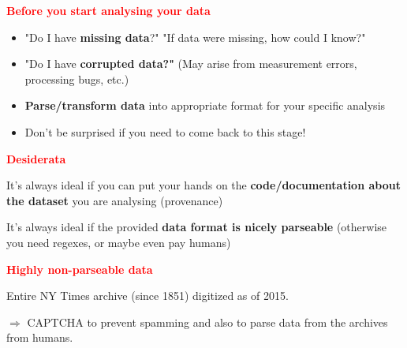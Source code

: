 \documentclass[11pt]{article}
\begin{document}
\vspace{0.5cm}

\textbf{\textcolor{red}{Before you start analysing your data}}

\begin{itemize}
	\item "Do I have \textbf{missing data}?" "If data were missing, how could I know?"
	\item "Do I have \textbf{corrupted data?"} (May arise from measurement errors, processing bugs, etc.) 
	\item \textbf{Parse/transform data} into appropriate format for your specific analysis 
	\item Don't be surprised if you need to come back to this stage!
\end{itemize}

\vspace{0.5cm}

\textbf{\textcolor{red}{Desiderata}}

It's always ideal if you can put your hands on the \textbf{code/documentation about the dataset} you are analysing (provenance)

It's always ideal if the provided \textbf{data format is nicely parseable} (otherwise you need regexes, or maybe even pay humans)

\vspace{0.5cm}

\textbf{\textcolor{red}{Highly non-parseable data}}

Entire NY Times archive (since 1851) digitized as of 2015. 

$\Rightarrow$ CAPTCHA to prevent spamming and also to parse data from the archives from humans. 
\end{document}
